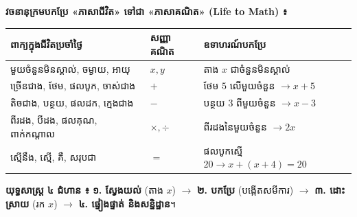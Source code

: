 \documentclass[theme=teal]{khmermath}
\begin{document}
\begin{khboxfeynman}
  \textbf{វចនានុក្រមបកប្រែ «ភាសាជីវិត» ទៅជា «ភាសាគណិត» (Life to Math) ៖}
  \begin{center}
    \small
    \begin{tabularx}{0.96\linewidth}{|>{\raggedright\arraybackslash}X|>{\centering\arraybackslash}p{2.8cm}|>{\raggedright\arraybackslash}X|}
      \hline
      \rowcolor{koreaTeal!15}
      \textbf{ពាក្យក្នុងជីវិតប្រចាំថ្ងៃ} & \textbf{សញ្ញាគណិត} & \textbf{ឧទាហរណ៍បកប្រែ} \\
      \hline
      មួយចំនួនមិនស្គាល់, ចម្ងាយ, អាយុ & $x, y$ & តាង $x$ ជាចំនួនមិនស្គាល់ \\
      ច្រើនជាង, ថែម, ផលបូក, ចាស់ជាង & $+$ & ថែម $5$ លើមួយចំនួន $\to x + 5$ \\
      តិចជាង, បន្ថយ, ផលដក, ក្មេងជាង & $-$ & បន្ថយ $3$ ពីមួយចំនួន $\to x - 3$ \\
      ពីរដង, បីដង, ផលគុណ, ពាក់កណ្ដាល & $\times, \div$ & ពីរដងនៃមួយចំនួន $\to 2x$ \\
      ស្មើនឹង, ស្មើ, គឺ, សរុបជា & $=$ & ផលបូកស្មើ $20 \to x + (x+4) = 20$ \\
      \hline
    \end{tabularx}
  \end{center}
  \vspace{1pt}
  \textbf{យុទ្ធសាស្ត្រ ៤ ជំហាន ៖} \textbf{១. ស្វែងយល់} (តាង $x$) $\to$ \textbf{២. បកប្រែ} (បង្កើតសមីការ) $\to$ \textbf{៣. ដោះស្រាយ} (រក $x$) $\to$ \textbf{៤. ផ្ទៀងផ្ទាត់ និងសន្និដ្ឋាន}។
\end{khboxfeynman}
\end{document}
